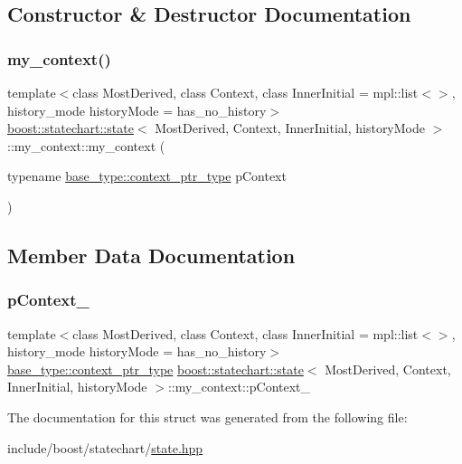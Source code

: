 \subsection{Constructor \& Destructor Documentation}
\mbox{\label{structboost_1_1statechart_1_1state_1_1my__context_ada86fa52dbe35f9e696b6432f0b103e3}} 
\subsubsection{\texorpdfstring{my\+\_\+context()}{my\_context()}}
{\footnotesize\ttfamily template$<$class Most\+Derived, class Context, class Inner\+Initial = mpl\+::list$<$$>$, history\+\_\+mode history\+Mode = has\+\_\+no\+\_\+history$>$ \\
\mbox{\hyperlink{classboost_1_1statechart_1_1state}{boost\+::statechart\+::state}}$<$ Most\+Derived, Context, Inner\+Initial, history\+Mode $>$\+::my\+\_\+context\+::my\+\_\+context (\begin{DoxyParamCaption}\item[{typename \mbox{\hyperlink{classboost_1_1statechart_1_1simple__state_ac7e361322d53b3f57976ff23056b59e7}{base\+\_\+type\+::context\+\_\+ptr\+\_\+type}}}]{p\+Context }\end{DoxyParamCaption})\hspace{0.3cm}{\ttfamily [inline]}}



\subsection{Member Data Documentation}
\mbox{\label{structboost_1_1statechart_1_1state_1_1my__context_a401a0168baaefd86a2673386f00e2b7b}} 
\subsubsection{\texorpdfstring{p\+Context\+\_\+}{pContext\_}}
{\footnotesize\ttfamily template$<$class Most\+Derived, class Context, class Inner\+Initial = mpl\+::list$<$$>$, history\+\_\+mode history\+Mode = has\+\_\+no\+\_\+history$>$ \\
\mbox{\hyperlink{classboost_1_1statechart_1_1simple__state_ac7e361322d53b3f57976ff23056b59e7}{base\+\_\+type\+::context\+\_\+ptr\+\_\+type}} \mbox{\hyperlink{classboost_1_1statechart_1_1state}{boost\+::statechart\+::state}}$<$ Most\+Derived, Context, Inner\+Initial, history\+Mode $>$\+::my\+\_\+context\+::p\+Context\+\_\+}



The documentation for this struct was generated from the following file\+:\begin{DoxyCompactItemize}
\item 
include/boost/statechart/\mbox{\hyperlink{state_8hpp}{state.\+hpp}}\end{DoxyCompactItemize}
